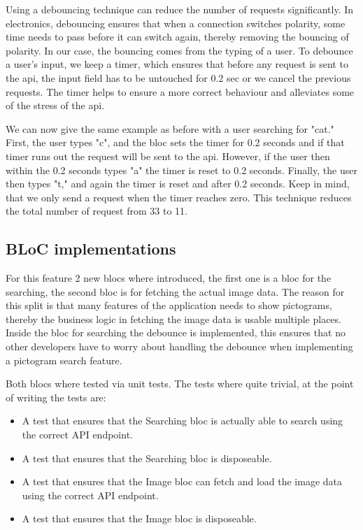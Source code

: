 Using a debouncing technique can reduce the number of requests significantly. In electronics, debouncing ensures that when a connection switches polarity, some time needs to pass before it can switch again, thereby removing the bouncing of polarity. In our case, the bouncing comes from the typing of a user. To debounce a user's input, we keep a timer, which ensures that before any request is sent to the \gls{api}, the input field has to be untouched for 0.2 sec or we cancel the previous requests. The timer helps to ensure a more correct behaviour and alleviates some of the stress of the \gls{api}.

We can now give the same example as before with a user searching for "cat." First, the user types "c", and the \gls{bloc} sets the timer for 0.2 seconds and if that timer runs out the request will be sent to the \gls{api}. However, if the user then within the 0.2 seconds types "a" the timer is reset to 0.2 seconds. Finally, the user then types "t," and again the timer is reset and after 0.2 seconds. Keep in mind, that we only send a request when the timer reaches zero. This technique reduces the total number of request from 33 to 11.

\subsection{BLoC implementations}
For this feature 2 new \glspl{bloc} where introduced, the first one is a \gls{bloc} for the searching, the second \gls{bloc} is for fetching the actual image data. The reason for this split is that many features of the application needs to show pictograms, thereby the business logic in fetching the image data is usable multiple places. Inside the \gls{bloc} for searching the debounce is implemented, this ensures that no other developers have to worry about handling the debounce when implementing a pictogram search feature.

Both \glspl{bloc} where tested via unit tests. The tests where quite trivial, at the point of writing the tests are:

\begin{itemize}
  \item A test that ensures that the Searching \gls{bloc} is actually able to search using the correct API endpoint.
  \item A test that ensures that the Searching \gls{bloc} is disposeable.
  \item A test that ensures that the Image \gls{bloc} can fetch and load the image data using the correct API endpoint.
  \item A test that ensures that the Image \gls{bloc} is disposeable.
\end{itemize}

